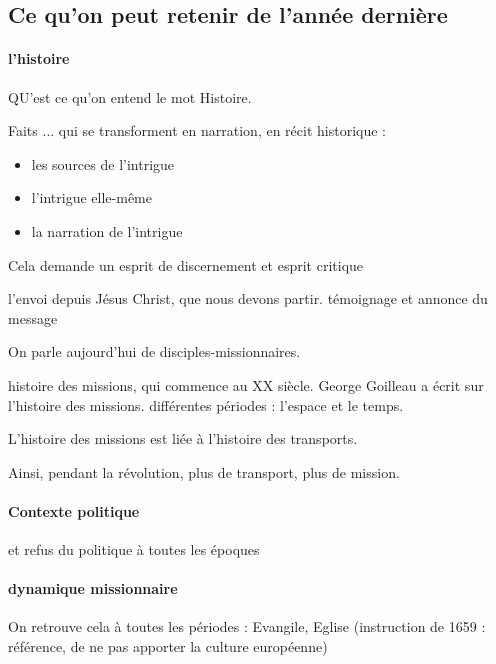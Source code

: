 \subsection{Ce qu'on peut retenir de l'année dernière}

\paragraph{l'histoire} QU'est ce qu'on entend le mot Histoire.
\begin{Def}[Histoire]
    Faits ... qui se transforment en narration, en récit historique : 
    \begin{itemize}
        \item les sources de l'intrigue
        \item l'intrigue elle-même
        \item la narration de l'intrigue
    \end{itemize}
\end{Def}
Cela demande un esprit de discernement et esprit critique

\begin{Def}[La Mission]
    l'envoi depuis Jésus Christ, que nous devons partir. 
    témoignage et annonce du message
\end{Def}
On parle aujourd'hui de disciples-missionnaires.

\begin{Def}
    histoire des missions, qui commence au XX siècle. George Goilleau a écrit sur l'histoire des missions.
    différentes périodes : l'espace et le temps. 
    
\end{Def}

L'histoire des missions est liée à l'histoire des transports. 
\begin{Ex}
    Ainsi, pendant la révolution, plus de transport, plus de mission.
\end{Ex}

\paragraph{Contexte politique}
 et refus du politique à toutes les époques

 \paragraph{dynamique missionnaire} On retrouve cela à toutes les périodes : Evangile, Eglise (instruction de 1659 : référence, de ne pas apporter la culture européenne)

